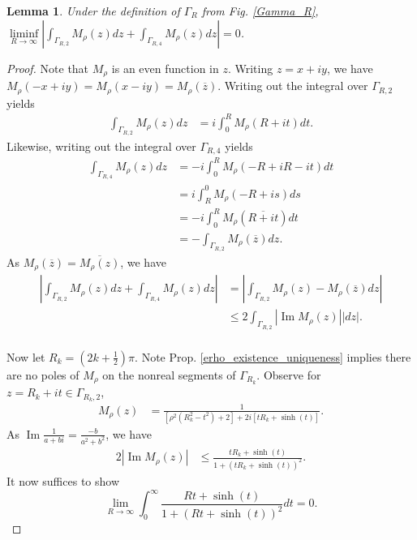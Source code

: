 \documentclass{amsart}
\theoremstyle{plain}
\numberwithin{theorem}{section}
\newtheorem{lemma}[theorem]{Lemma}
\DeclareMathOperator{\Imz}{Im}
\theoremstyle{definition}
\theoremstyle{remark}
\theoremstyle{brakets}
\begin{document}
\begin{lemma}
    Under the definition of $\Gamma_R$ from Fig. \ref{Gamma_R}, $ \liminf\limits_{R \to \infty} \left| \int_{\Gamma_{R,2}} M_{\rho}(z)dz + \int_{\Gamma_{R,4}} M_{\rho}(z)dz \right| =  0$.
\end{lemma}
\begin{proof}
Note that $M_\rho$ is an even function in $z$. Writing $z = x + iy$, we have $M_\rho(-x+iy) = M_\rho(x -iy) = M_\rho(\overline{z}).$ Writing out the integral over $\Gamma_{R,2}$ yields
\begin{align*}
\int_{\Gamma_{R,2}} M_\rho(z)dz &= i\int_0^R M_\rho(R + it)dt. 
\end{align*}
\noindent Likewise, writing out the integral over $\Gamma_{R,4}$ yields
\begin{align*}
    \int_{\Gamma_{R,4}} M_\rho(z)dz &= -i \int_0^R M_\rho(-R + iR -it)dt \\
    &= i \int_R^0 M_\rho(-R + is)ds \\
    &= -i \int_0^R M_\rho(\overline{R + it})dt\\
    &= -\int_{\Gamma_{R,2}} M_\rho(\overline{z})dz.
\end{align*}
\noindent As $M_\rho(\overline{z}) = \overline{M_\rho(z)}$, we have 
\begin{align*}
    \left| \int_{\Gamma_{R,2}} M_{\rho}(z)dz + \int_{\Gamma_{R,4}} M_{\rho}(z)dz \right| &= \left| \int_{\Gamma_{R,2}} M_\rho(z) - M_\rho(\overline{z}) dz \right| \\
    &\leq 2 \int_{\Gamma_{R,2}} \left|  \Imz M_{\rho}(z) \right| |dz|. \\
\end{align*}

Now let $R_k = (2k + \frac{1}{2})\pi$. Note Prop. \ref{erho_existence_uniqueness} implies there are no poles of $M_\rho$ on the nonreal segments of $\Gamma_{R_k}$. Observe for $z = R_k + it \in \Gamma_{R_k,2}$, 
\begin{align*}
    M_\rho(z) &= \frac{1}{[\rho^2(R_k^2 - t^2) + 2] + 2i[tR_k + \sinh(t)]}.
\end{align*}
\noindent As $\Imz \frac{1}{a+bi} = \frac{-b}{a^2 + b^2}$, we have
\begin{align*}
   2 \left| \Imz M_\rho(z) \right| &\leq \frac{tR_k + \sinh(t)}{1 + (tR_k + \sinh(t))^2}.
\end{align*}
\noindent It now suffices to show $$\lim\limits_{R \to \infty} \int_0^{\infty} \frac{Rt + \sinh(t)}{1 + (Rt + \sinh(t))^2}dt = 0.$$


\end{proof}
\end{document}
